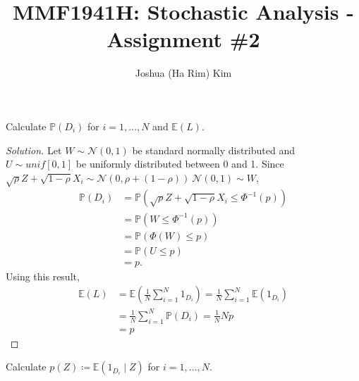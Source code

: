 \documentclass[10pt]{article}
\newcommand{\E}{\mathbb{E}}
\newenvironment{problem}[2][Problem]{\begin{trivlist}
\item[\hskip \labelsep {\bfseries #1}\hskip \labelsep {\bfseries #2.}]}{\end{trivlist}}
\begin{document}
\title{MMF1941H: Stochastic Analysis - Assignment \#2}
\author{Joshua (Ha Rim) Kim}
\maketitle



\begin{problem}{1}
    Calculate $\mathbb{P}(D_i)$ for $i = 1, \ldots, N$ and $\E(L)$.
\end{problem}

\begin{proof}[Solution]
    Let $W \sim \mathcal{N}(0, 1)$ be standard normally distributed and $U \sim unif[0,1]$ be uniformly distributed between 0 and 1.
    Since $\sqrt{\rho} Z + \sqrt{1 - \rho} X_i \sim \mathcal{N}(0, \rho + (1 - \rho)) ~ \mathcal{N}(0,1) \sim W$,
    \begin{align*}
        \mathbb{P}(D_i) &= \mathbb{P}(\sqrt{\rho} Z + \sqrt{1 - \rho} X_i \leq \Phi^{-1}(p)) \\
        &= \mathbb{P}(W \leq \Phi^{-1}(p)) \\
        &= \mathbb{P}(\Phi(W) \leq p) \\
        &= \mathbb{P}(U \leq p) \\
        &= p.
    \end{align*}
    Using this result,
    \begin{align*}
        \E(L) &= \E \left(\frac{1}{N} \sum_{i=1}^N 1_{D_i} \right) = \frac{1}{N} \sum_{i=1}^{N} \E(1_{D_i}) \\
        &= \frac{1}{N} \sum_{i=1}^{N} \mathbb{P}(D_i) = \frac{1}{N} N p \\
        &= p
    \end{align*}
\end{proof}



\begin{problem}{2}
    Calculate $p(Z) \coloneq \E(1_{D_i} \mid Z)$ for $i = 1, \ldots, N$.
\end{problem}
\end{document}

